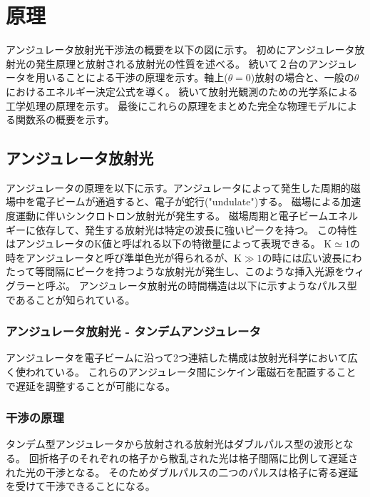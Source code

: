 \documentclass[a4paper,11pt,uplatex]{jsarticle}
\begin{document}
\section{原理}
アンジュレータ放射光干渉法の概要を以下の図に示す。
初めにアンジュレータ放射光の発生原理と放射される放射光の性質を述べる。
続いて２台のアンジュレータを用いることによる干渉の原理を示す。軸上($\theta =0$)放射の場合と、一般の$\theta$におけるエネルギー決定公式を導く。
続いて放射光観測のための光学系による工学処理の原理を示す。
最後にこれらの原理をまとめた完全な物理モデルによる関数系の概要を示す。
\subsection{アンジュレータ放射光}
アンジュレータの原理を以下に示す。アンジュレータによって発生した周期的磁場中を電子ビームが通過すると、電子が蛇行("undulate")する。
磁場による加速度運動に伴いシンクロトロン放射光が発生する。
磁場周期と電子ビームエネルギーに依存して、発生する放射光は特定の波長に強いピークを持つ。
この特性はアンジュレータのK値と呼ばれる以下の特徴量によって表現できる。
$\text{K} \simeq 1$の時をアンジュレータと呼び準単色光が得られるが、$\text{K} \gg 1$の時には広い波長にわたって等間隔にピークを持つような放射光が発生し、このような挿入光源をウィグラーと呼ぶ。
アンジュレータ放射光の時間構造は以下に示すようなパルス型であることが知られている。
\subsubsection{アンジュレータ放射光 - タンデムアンジュレータ}
アンジュレータを電子ビームに沿って2つ連結した構成は放射光科学において広く使われている。
これらのアンジュレータ間にシケイン電磁石を配置することで遅延を調整することが可能になる。
\subsubsection{干渉の原理}
タンデム型アンジュレータから放射される放射光はダブルパルス型の波形となる。
回折格子のそれぞれの格子から散乱された光は格子間隔に比例して遅延された光の干渉となる。
そのためダブルパルスの二つのパルスは格子に寄る遅延を受けて干渉できることになる。
\end{document}
